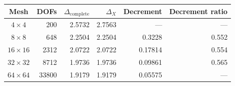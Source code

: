 \begin{tabularx}{\textwidth}{@{}c r r r r r@{}}
\toprule
Mesh & DOFs & $\Delta_{\mathrm{complete}}$ & $\Delta_X$ & Decrement & Decrement ratio \\
\midrule
$4\times4$ & 200 & 2.5732 & 2.7563 & --- & --- \\
$8\times8$ & 648 & 2.2504 & 2.2504 & 0.3228 & 0.552 \\
$16\times16$ & 2312 & 2.0722 & 2.0722 & 0.17814 & 0.554 \\
$32\times32$ & 8712 & 1.9736 & 1.9736 & 0.09861 & 0.565 \\
$64\times64$ & 33800 & 1.9179 & 1.9179 & 0.05575 & --- \\
\bottomrule
\end{tabularx}
